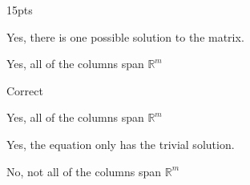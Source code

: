 \begin{prob} 15pts
\begin{subprob}
\begin{subsubprob}
Yes, there is one possible solution to the matrix.
\end{subsubprob}
\begin{subsubprob}
Yes, all of the columns span $\mathbb{R}^m$
\end{subsubprob}
\end{subprob}
\begin{subprob}

\begin{subsubprob}
Correct
\end{subsubprob}
\begin{subsubprob}
Yes, all of the columns span $\mathbb{R}^m$
\end{subsubprob}
\end{subprob}
\begin{subprob}
\begin{subsubprob}
Yes, the equation only has the trivial solution.
\end{subsubprob}
\begin{subsubprob}
No, not all of the columns span $\mathbb{R}^m$
\end{subsubprob}
\end{subprob}
\end{prob}